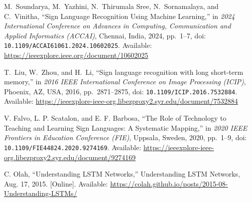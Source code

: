 \documentclass[12pt]{article}
\begin{document}
\begin{thebibliography}{99}
M.~Soundarya, M.~Yazhini, N.~Thirumala Sree, N.~Sornamalaya, and C.~Vinitha, 
“Sign Language Recognition Using Machine Learning,” 
in \emph{2024 International Conference on Advances in Computing, Communication and Applied Informatics (ACCAI)}, 
Chennai, India, 2024, pp.~1--7, 
doi: \texttt{10.1109/ACCAI61061.2024.10602025}.
Available: \url{https://ieeexplore.ieee.org/document/10602025}

T.~Liu, W.~Zhou, and H.~Li, 
“Sign language recognition with long short-term memory,” 
in \emph{2016 IEEE International Conference on Image Processing (ICIP)}, 
Phoenix, AZ, USA, 2016, pp.~2871--2875, 
doi: \texttt{10.1109/ICIP.2016.7532884}. 
Available: \url{https://ieeexplore-ieee-org.libezproxy2.syr.edu/document/7532884}

V. Falvo, L. P. Scatalon, and E. F. Barbosa, 
“The Role of Technology to Teaching and Learning Sign Languages: A Systematic Mapping,” 
in \emph{2020 IEEE Frontiers in Education Conference (FIE)}, Uppsala, Sweden, 2020, pp.~1--9, 
doi: \texttt{10.1109/FIE44824.2020.9274169}.  
Available: \url{https://ieeexplore-ieee-org.libezproxy2.syr.edu/document/9274169}

C. Olah, 
“Understanding LSTM Networks,” 
Understanding LSTM Networks, Aug. 17, 2015. [Online].  
Available: \url{https://colah.github.io/posts/2015-08-Understanding-LSTMs/}


\end{thebibliography}
\end{document}
